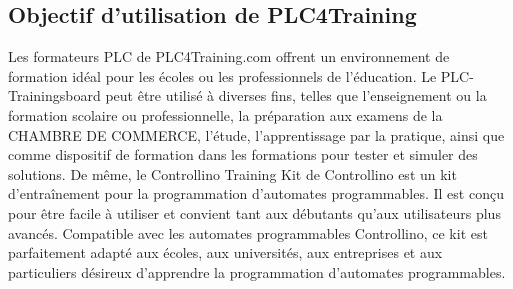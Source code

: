 \documentclass[a4paper,12pt]{report}
\begin{document}
\subsection{Objectif d'utilisation de PLC4Training}
\begin{center}
\label{}
\end{center}
Les formateurs PLC de PLC4Training.com offrent un environnement de formation idéal pour les écoles ou les professionnels de l'éducation. Le PLC-Trainingsboard peut être utilisé à diverses fins, telles que l'enseignement ou la formation scolaire ou professionnelle, la préparation aux examens de la CHAMBRE DE COMMERCE, l'étude, l'apprentissage par la pratique, ainsi que comme dispositif de formation dans les formations pour tester et simuler des solutions. De même, le Controllino Training Kit de Controllino est un kit d’entraînement pour la programmation d’automates programmables. Il est conçu pour être facile à utiliser et convient tant aux débutants qu'aux utilisateurs plus avancés. Compatible avec les automates programmables Controllino, ce kit est parfaitement adapté aux écoles, aux universités, aux entreprises et aux particuliers désireux d'apprendre la programmation d'automates programmables.
\end{document}

